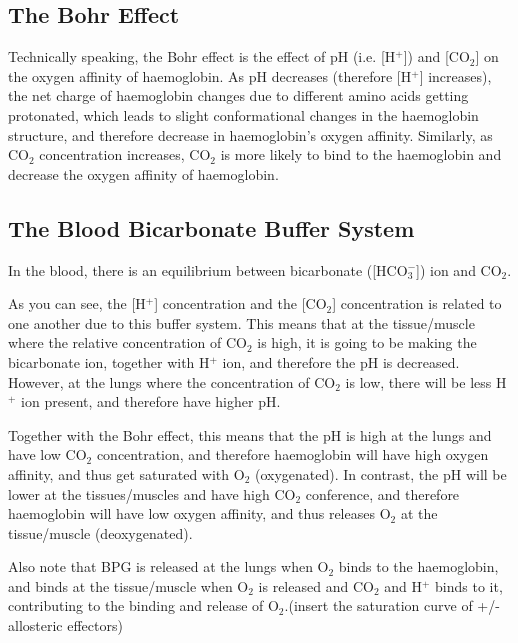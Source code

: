 \subsection{The Bohr Effect}

Technically speaking, the Bohr effect is the effect of pH (i.e. [H$^+$]) and [CO$_2$] on the oxygen affinity of haemoglobin.
As pH decreases (therefore [H$^+$] increases), the net charge of haemoglobin changes due to different amino acids getting protonated, which leads to slight conformational changes in the haemoglobin structure, and therefore decrease in haemoglobin's oxygen affinity.
Similarly, as CO$_2$ concentration increases, CO$_2$ is more likely to bind to the haemoglobin and decrease the oxygen affinity of haemoglobin.

\subsection{The Blood Bicarbonate Buffer System}

In the blood, there is an equilibrium between bicarbonate ([HCO$_3^-$]) ion and CO$_2$.

\begin{center}
\end{center}

As you can see, the [H$^+$] concentration and the [CO$_2$] concentration is related to one another due to this buffer system.
This means that at the tissue/muscle where the relative concentration of CO$_2$ is high, it is going to be making the bicarbonate ion, together with H$^+$ ion, and therefore the pH is decreased.
However, at the lungs where the concentration of CO$_2$ is low, there will be less H$^+$ ion present, and therefore have higher pH.

Together with the Bohr effect, this means that the pH is high at the lungs and have low CO$_2$ concentration, and therefore haemoglobin will have high oxygen affinity, and thus get saturated with O$_2$ (oxygenated).
In contrast, the pH will be lower at the tissues/muscles and have high CO$_2$ conference, and therefore haemoglobin will have low oxygen affinity, and thus releases O$_2$ at the tissue/muscle (deoxygenated).

Also note that BPG is released at the lungs when O$_2$ binds to the haemoglobin, and binds at the tissue/muscle when O$_2$ is released and CO$_2$ and H$^+$ binds to it, contributing to the binding and release of O$_2$.(insert the saturation curve of +/- allosteric effectors)

